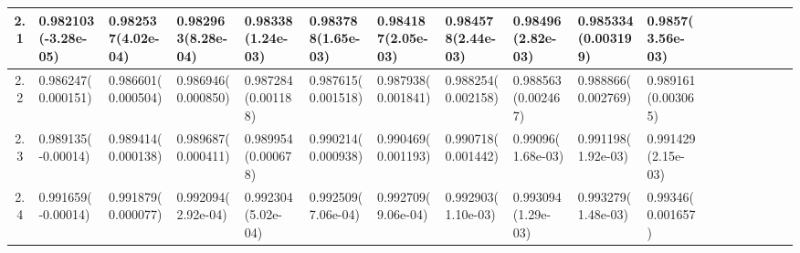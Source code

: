 \documentclass[
	article,			%
	12pt,				%
	twoside,			%
	a4paper,			%
	english,			%
	brazil,				%
	]{abntex2}
\begin{document}
\begin{landscape}
\begin{table}
\begin{tabular}{c||p{18mm}|p{18mm}|p{18mm}|p{18mm}|p{18mm}|p{18mm}|p{18mm}|p{18mm}|p{18mm}|p{18mm}|p{18mm}|p{18mm}|p{18mm}|p{18mm}|p{18mm}|p{18mm}|p{18mm}}
    			2.1 &0.982103\newline(-3.28e-05)&0.982537\newline(4.02e-04)&0.982963\newline(8.28e-04)&0.98338\newline(1.24e-03)&0.983788\newline(1.65e-03)&0.984187\newline(2.05e-03)&0.984578\newline(2.44e-03)&0.98496\newline(2.82e-03)&0.985334\newline(0.003199)&0.9857\newline(3.56e-03)\\\hline
    			2.2 &0.986247\newline(0.000151)&0.986601\newline(0.000504)&0.986946\newline(0.000850)&0.987284\newline(0.001188)&0.987615\newline(0.001518)&0.987938\newline(0.001841)&0.988254\newline(0.002158)&0.988563\newline(0.002467)&0.988866\newline(0.002769)&0.989161\newline(0.003065)\\\hline
    			2.3 &0.989135\newline(-0.00014)&0.989414\newline(0.000138)&0.989687\newline(0.000411)&0.989954\newline(0.000678)&0.990214\newline(0.000938)&0.990469\newline(0.001193)&0.990718\newline(0.001442)&0.99096\newline(1.68e-03)&0.991198\newline(1.92e-03)&0.991429\newline(2.15e-03)\\\hline
    			2.4 &0.991659\newline(-0.00014)&0.991879\newline(0.000077)&0.992094\newline(2.92e-04)&0.992304\newline(5.02e-04)&0.992509\newline(7.06e-04)&0.992709\newline(9.06e-04)&0.992903\newline(1.10e-03)&0.993094\newline(1.29e-03)&0.993279\newline(1.48e-03)&0.99346\newline(0.001657)\\\hline
    			

\end{tabular}
\end{table}
\end{landscape}
\end{document}
